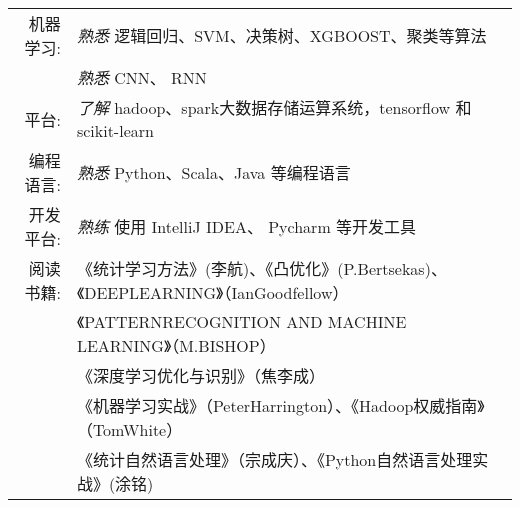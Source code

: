 %
%



\renewcommand{\arraystretch}{1.1}

	\begin{tabular}{>{}r>{}p{13cm}}

		\textsc{机器学习:}
                              &  \emph{熟悉}  逻辑回归、SVM、决策树、XGBOOST、聚类等算法 \\
                              &  \emph{熟悉}   CNN、  RNN \\
							  
		\textsc{平台:}	    &  \emph{了解}   hadoop、spark大数据存储运算系统，tensorflow 和 scikit-learn  \\
        \textsc{编程语言:}	  &  \emph{熟悉}   Python、Scala、Java 等编程语言  \\
		\textsc{开发平台:}	  &  \emph{熟练} 使用 IntelliJ IDEA、 Pycharm 等开发工具 \\
        \textsc{阅读书籍:}    &  《统计学习方法》(李航)、《凸优化》(P.Bertsekas)、《DEEPLEARNING》（IanGoodfellow）\\
                             &  《PATTERNRECOGNITION AND MACHINE LEARNING》（M.BISHOP）\\
							 & 《深度学习优化与识别》（焦李成）\\
                             &  《机器学习实战》（PeterHarrington）、《Hadoop权威指南》（TomWhite）\\
                             &  《统计自然语言处理》（宗成庆）、《Python自然语言处理实战》(涂铭)
	\end{tabular}

